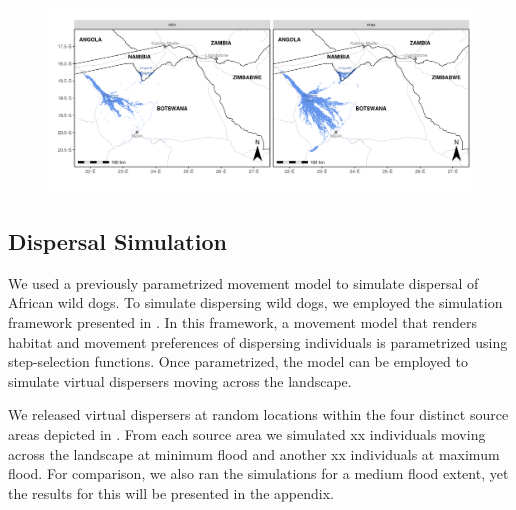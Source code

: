 \documentclass[abstract=on,10pt,a4paper,bibliography=totocnumbered]{article}
\begin{document}
\begin{figure}
  \begin{center}
  \includegraphics[width = \textwidth]{99_FloodExtent.png}
  \caption{}
  \label{FloodExtent}
  \end{center}
\end{figure}

\subsection{Dispersal Simulation}
We used a previously parametrized movement model to simulate dispersal of
African wild dogs. To simulate dispersing wild dogs, we employed the simulation
framework presented in \cite{Hofmann.2022}. In this framework, a movement model
that renders habitat and movement preferences of dispersing individuals is
parametrized using step-selection functions. Once parametrized, the model can be
employed to simulate virtual dispersers moving across the landscape.

We released virtual dispersers at random locations within the four distinct
source areas depicted in . From each source area we simulated xx
individuals moving across the landscape at minimum flood and another xx
individuals at maximum flood. For comparison, we also ran the simulations for a
medium flood extent, yet the results for this will be presented in the appendix.
\end{document}

